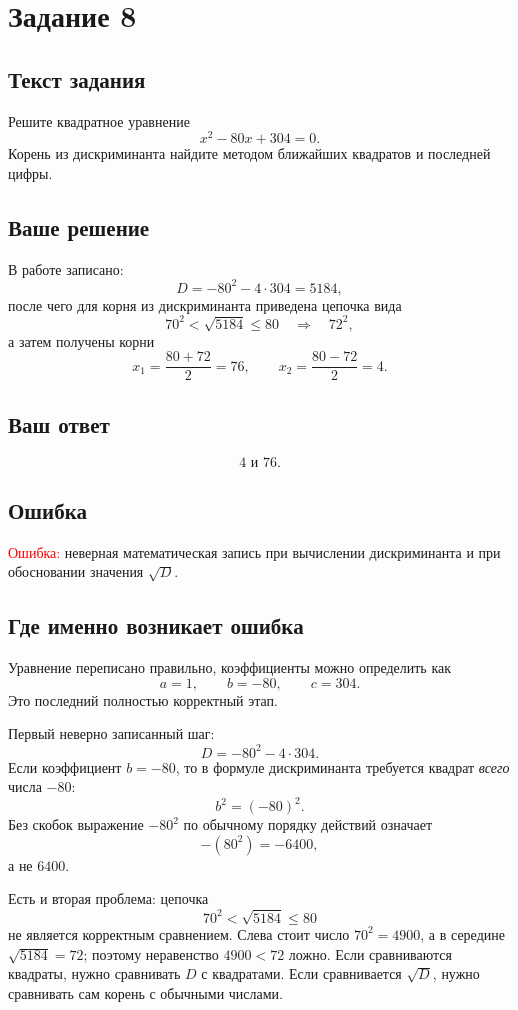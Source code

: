 \documentclass[12pt,a4paper]{article}
\begin{document}
\newpage
{}\label{task:8}
\section*{Задание 8}

\subsection*{Текст задания}
Решите квадратное уравнение
\[
x^2-80x+304=0.
\]
Корень из дискриминанта найдите методом ближайших квадратов и последней цифры.

\subsection*{Ваше решение}
В работе записано:
\[
D=-80^2-4\cdot304=5184,
\]
после чего для корня из дискриминанта приведена цепочка вида
\[
70^2<\sqrt{5184}\le 80\quad\Longrightarrow\quad 72^2,
\]
а затем получены корни
\[
x_1=\frac{80+72}{2}=76,\qquad
x_2=\frac{80-72}{2}=4.
\]

\subsection*{Ваш ответ}
\[
4\text{ и }76.
\]

\subsection*{Ошибка}
\textcolor{red}{Ошибка:} неверная математическая запись при вычислении дискриминанта и при обосновании значения $\sqrt{D}$.

\subsection*{Где именно возникает ошибка}
Уравнение переписано правильно, коэффициенты можно определить как
\[
a=1,\qquad b=-80,\qquad c=304.
\]
Это последний полностью корректный этап.

Первый неверно записанный шаг:
\[
D=-80^2-4\cdot304.
\]
Если коэффициент $b=-80$, то в формуле дискриминанта требуется квадрат \emph{всего} числа $-80$:
\[
b^2=(-80)^2.
\]
Без скобок выражение $-80^2$ по обычному порядку действий означает
\[
-(80^2)=-6400,
\]
а не $6400$.

Есть и вторая проблема: цепочка
\[
70^2<\sqrt{5184}\le 80
\]
не является корректным сравнением. Слева стоит число $70^2=4900$, а в середине $\sqrt{5184}=72$; поэтому неравенство $4900<72$ ложно. Если сравниваются квадраты, нужно сравнивать $D$ с квадратами. Если сравнивается $\sqrt D$, нужно сравнивать сам корень с обычными числами.
\end{document}
